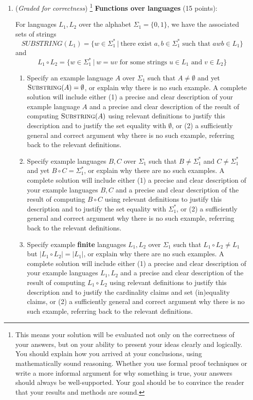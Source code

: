 \documentclass[12pt, oneside]{article}
\newcommand{\gradeCorrect}{({\it Graded for correctness}) }
\newcommand{\gradeCorrectFirst}{\gradeCorrect\footnote{This means your solution 
will be evaluated not only on the correctness of your answers, but on your ability
to present your ideas clearly and logically. You should explain how you 
arrived at your conclusions, using
mathematically sound reasoning. Whether you use formal proof techniques or 
write a more informal argument
for why something is true, your answers should always be well-supported. 
Your goal should be to convince the
reader that your results and methods are sound.} }
\newcommand{\SUBSTRING}{\textsc{Substring}}
\begin{document}
\begin{enumerate}[wide, labelwidth=!, labelindent=0pt]
\begin{enumerate}
    \end{enumerate}

\item\gradeCorrectFirst \textbf{Functions over languages} (15 points):

For languages $L_1, L_2$ over the alphabet $\Sigma_1 = \{0,1\}$, we have the 
associated sets of strings
\[
    SUBSTRING(L_1) = \{ w \in \Sigma_1^* ~|~ \text{there exist } a,b \in \Sigma_1^* \text{ such that } awb \in L_1\}
\]
and 
\[
    L_1 \circ L_2 = \{ w \in \Sigma_1^* ~|~ w = uv \text{ for some strings } u \in L_1 \text{ and } v \in L_2 \}
\]
    \begin{enumerate}
    \item Specify an example language $A$ over $\Sigma_1$ such that 
    $A \neq \emptyset$ and yet $\SUBSTRING(A) = \emptyset$, 
    or explain why there is no such example. 
    A complete solution will include either (1) a precise and
    clear description of your example language $A$ 
    and a precise and clear description of
    the result of computing $\SUBSTRING(A)$ using relevant definitions 
    to justify this description and to justify the set equality with 
    $\emptyset$, or (2) a sufficiently general and correct argument
    why there is no such example, referring back to the relevant definitions.

    \item Specify example languages $B, C$ over $\Sigma_1$ such that 
    $B \neq \Sigma_1^*$ and $C \neq \Sigma_1^*$ and yet $B \circ C = \Sigma_1^*$, 
    or explain why there are no such examples. 
    A complete solution will include either (1) a precise and
    clear description of your example languages $B,C$ 
    and a precise and clear description of
    the result of computing $B \circ C$ using relevant definitions 
    to justify this description and to justify the set equality with 
    $\Sigma_1^*$, or (2) a sufficiently general and correct argument
    why there is no such example, referring back to the relevant definitions.

    \item Specify example {\bf finite} languages $L_1, L_2$ over $\Sigma_1$ such that 
    $L_1 \circ L_2 \neq L_1$ but $|L_1 \circ L_2| = |L_1|$, or 
    explain why there are no such examples.
    A complete solution will include either (1) a precise and
    clear description of your example languages $L_1, L_2$ 
    and a precise and clear description of
    the result of computing $L_1 \circ L_2$ using relevant definitions 
    to justify this description and to justify the cardinality claims and set (in)equality claims, 
    or (2) a sufficiently general and correct argument
    why there is no such example, referring back to the relevant definitions.
    \end{enumerate}



\end{enumerate}
\end{document}
